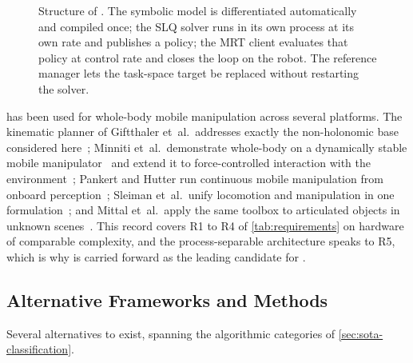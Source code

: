 \begin{figure}[htbp]
  \caption[Structure of the \ocs{} framework]{%
    Structure of \ocs{}. The symbolic model is differentiated
    automatically and compiled once; the SLQ solver runs in its own
    process at its own rate and publishes a policy; the MRT client
    evaluates that policy at control rate and closes the loop on the
    robot. The reference manager lets the task-space target be replaced
    without restarting the solver.}
  \label{fig:ocs2-structure}
\end{figure}

\ocs{} has been used for whole-body mobile manipulation across several
platforms. The kinematic planner of Giftthaler et~al.\ addresses exactly
the non-holonomic base considered here~\cite{Giftthaler2017Kinematic};
Minniti et~al.\ demonstrate whole-body \mpc{} on a dynamically stable
mobile manipulator~\cite{Minniti2019WholeBodyMPC} and extend it to
force-controlled interaction with the
environment~\cite{Minniti2021Interaction}; Pankert and Hutter run
continuous mobile manipulation from onboard
perception~\cite{Pankert2020PerceptiveMPC}; Sleiman et~al.\ unify
locomotion and manipulation in one \mpc{}
formulation~\cite{Sleiman2021UnifiedMPC}; and Mittal et~al.\ apply the
same toolbox to articulated objects in unknown
scenes~\cite{Mittal2022Articulated}. This record covers R1 to R4 of
\cref{tab:requirements} on hardware of comparable complexity, and the
process-separable architecture speaks to R5, which is why \ocs{} is
carried forward as the leading candidate for \hero{}.

\subsection{Alternative Frameworks and Methods}
\label{sec:sota-alternatives}

Several alternatives to \ocs{} exist, spanning the algorithmic
categories of \cref{sec:sota-classification}.

